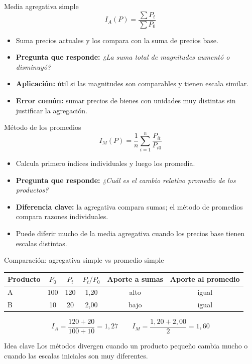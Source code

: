 \documentclass[aspectratio=169,11pt]{beamer}
\newcommand{\pregunta}[1]{\textbf{Pregunta que responde:} \emph{#1}}
\newcommand{\errorcomun}[1]{\textbf{Error común:} #1}
\newcommand{\diferencia}[1]{\textbf{Diferencia clave:} #1}
\begin{document}
\begin{frame}{Media agregativa simple}
\[
I_A(P)=\frac{\sum P_t}{\sum P_0}
\]
\begin{itemize}
  \item Suma precios actuales y los compara con la suma de precios base.
  \item \pregunta{¿La suma total de magnitudes aumentó o disminuyó?}
  \item \textbf{Aplicación:} útil si las magnitudes son comparables y tienen escala similar.
  \item \errorcomun{sumar precios de bienes con unidades muy distintas sin justificar la agregación.}
\end{itemize}
\end{frame}

\begin{frame}{Método de los promedios}
\[
I_M(P)=\frac{1}{n}\sum_{i=1}^{n}\frac{P_{it}}{P_{i0}}
\]
\begin{itemize}
  \item Calcula primero índices individuales y luego los promedia.
  \item \pregunta{¿Cuál es el cambio relativo promedio de los productos?}
  \item \diferencia{la agregativa compara sumas; el método de promedios compara razones individuales.}
  \item Puede diferir mucho de la media agregativa cuando los precios base tienen escalas distintas.
\end{itemize}
\end{frame}

\begin{frame}{Comparación: agregativa simple vs promedio simple}
\small
\begin{center}
\begin{tabular}{lccccc}
\toprule
Producto & $P_0$ & $P_t$ & $P_t/P_0$ & Aporte a sumas & Aporte al promedio \\
\midrule
A & 100 & 120 & 1,20 & alto & igual \\
B & 10 & 20 & 2,00 & bajo & igual \\
\bottomrule
\end{tabular}
\end{center}
\[
I_A=\frac{120+20}{100+10}=1{,}27 \qquad
I_M=\frac{1{,}20+2{,}00}{2}=1{,}60
\]
\begin{block}{Idea clave}
Los métodos divergen cuando un producto pequeño cambia mucho o cuando las escalas iniciales son muy diferentes.
\end{block}
\end{frame}
\end{document}
